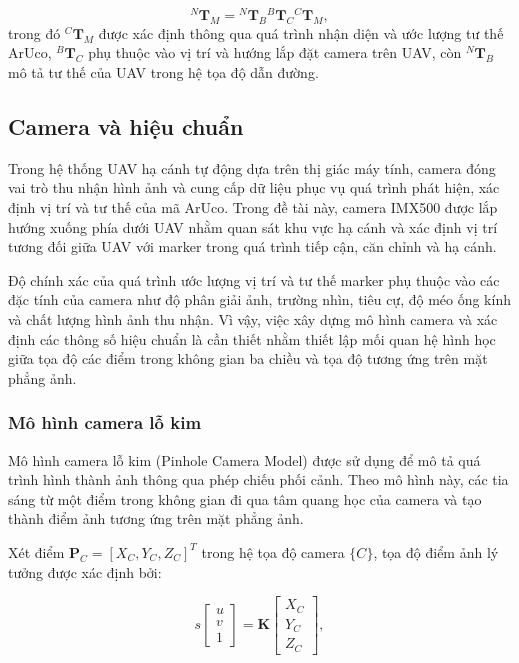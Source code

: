 \begin{equation}
    {}^{N}\mathbf{T}_{M}
    =
    {}^{N}\mathbf{T}_{B}
    {}^{B}\mathbf{T}_{C}
    {}^{C}\mathbf{T}_{M},
    \label{eq:coordinate_transform_chain}
\end{equation}
\indent trong đó ${}^{C}\mathbf{T}_{M}$ được xác định thông qua quá trình nhận diện và ước lượng tư thế ArUco, ${}^{B}\mathbf{T}_{C}$ phụ thuộc vào vị trí và hướng lắp đặt camera trên UAV, còn ${}^{N}\mathbf{T}_{B}$ mô tả tư thế của UAV trong hệ tọa độ dẫn đường.

\subsection{Camera và hiệu chuẩn}

Trong hệ thống UAV hạ cánh tự động dựa trên thị giác máy tính, camera đóng vai trò thu nhận hình ảnh và cung cấp dữ liệu phục vụ quá trình phát hiện, xác định vị trí và tư thế của mã ArUco. Trong đề tài này, camera IMX500 được lắp hướng xuống phía dưới UAV nhằm quan sát khu vực hạ cánh và xác định vị trí tương đối giữa UAV với marker trong quá trình tiếp cận, căn chỉnh và hạ cánh.

Độ chính xác của quá trình ước lượng vị trí và tư thế marker phụ thuộc vào các đặc tính của camera như độ phân giải ảnh, trường nhìn, tiêu cự, độ méo ống kính và chất lượng hình ảnh thu nhận. Vì vậy, việc xây dựng mô hình camera và xác định các thông số hiệu chuẩn là cần thiết nhằm thiết lập mối quan hệ hình học giữa tọa độ các điểm trong không gian ba chiều và tọa độ tương ứng trên mặt phẳng ảnh.

\subsubsection{Mô hình camera lỗ kim}

Mô hình camera lỗ kim (Pinhole Camera Model) được sử dụng để mô tả quá trình hình thành ảnh thông qua phép chiếu phối cảnh. Theo mô hình này, các tia sáng từ một điểm trong không gian đi qua tâm quang học của camera và tạo thành điểm ảnh tương ứng trên mặt phẳng ảnh.

Xét điểm $\mathbf{P}_C=[X_C,Y_C,Z_C]^T$ trong hệ tọa độ camera $\{C\}$, tọa độ điểm ảnh lý tưởng được xác định bởi:

\begin{equation}
    s
    \begin{bmatrix}
        u\\
        v\\
        1
    \end{bmatrix}
    =
    \mathbf{K}
    \begin{bmatrix}
        X_C\\
        Y_C\\
        Z_C
    \end{bmatrix},
    \label{eq:camera_projection}
\end{equation}

